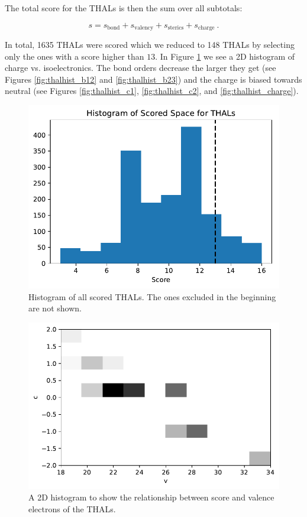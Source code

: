 The total score for the THALs is then the sum over all subtotals:

\begin{equation}
	s =  s_{\textrm{bond}}  + s_{\textrm{valency}} + s_{\textrm{sterics}} + s_{\textrm{charge}} ~.
\end{equation}

In total, 1635 THALs were scored which we reduced to 148 THALs by selecting only the ones with a score higher than $13$. In Figure \ref{fig:thalhist} we see a 2D histogram of charge vs. isoelectronics. The bond orders decrease the larger they get (see Figures \ref{fig:thalhist_b12} and \ref{fig:thalhist_b23}) and the charge is biased towards neutral (see Figures \ref{fig:thalhist_c1}, \ref{fig:thalhist_c2}, and \ref{fig:thalhist_charge}).

\begin{figure}[]{}
\centering
\includegraphics[width=.7\linewidth]{img/thal_ss_hist.pdf} 
\caption{Histogram of all scored THALs. The ones excluded in the beginning are not shown.}
\label{fig:thalhist}
\end{figure}

\begin{figure}[]{}
\centering
\includegraphics[width=.7\linewidth]{img/thal_ss_score_vs_v_2d_hist.pdf} 
\caption{A 2D histogram to show the relationship between score and valence electrons of the THALs.}
\label{fig:thal2dhist}
\end{figure}

